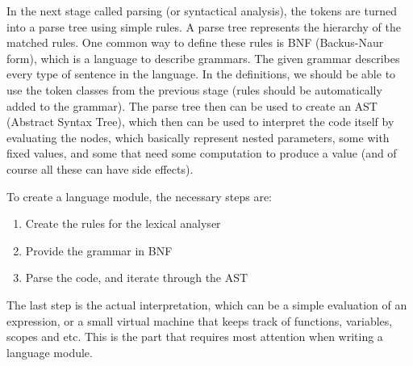 In the next stage called parsing (or syntactical analysis), the tokens are turned into a parse tree using simple rules. A parse tree represents the hierarchy of the matched rules. One common way to define these rules is BNF (Backus-Naur form), which is a language to describe grammars. The given grammar describes every type of sentence in the language. In the definitions, we should be able to use the token classes from the previous stage (rules should be automatically added to the grammar). The parse tree then can be used to create an AST (Abstract Syntax Tree), which then can be used to interpret the code itself by evaluating the nodes, which basically represent nested parameters, some with fixed values, and some that need some computation to produce a value (and of course all these can have side effects).

To create a language module, the necessary steps are:
\begin{enumerate}
\item Create the rules for the lexical analyser
\item Provide the grammar in BNF
\item Parse the code, and iterate through the AST
\end{enumerate}
The last step is the actual interpretation, which can be a simple evaluation of an expression, or a small virtual machine that keeps track of functions, variables, scopes and etc. This is the part that requires most attention when writing a language module.

